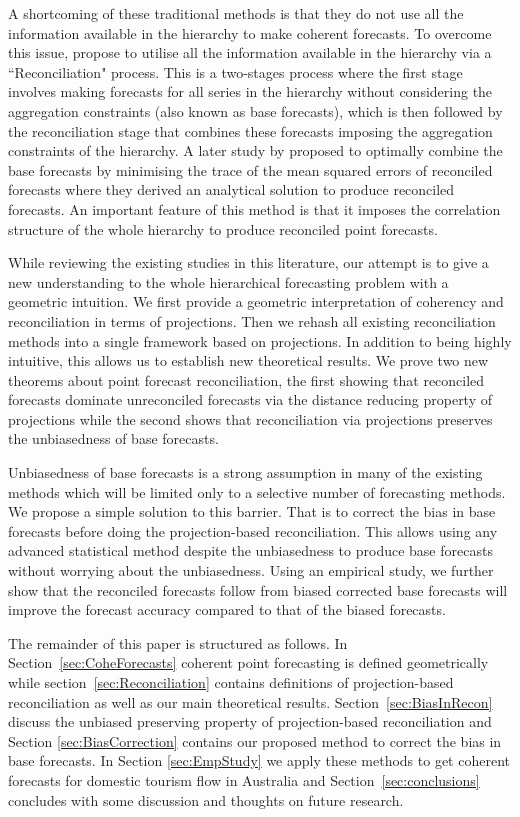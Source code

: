 \documentclass[12pt]{article}
\theoremstyle{definition}
\theoremstyle{property}
\begin{document}
	A shortcoming of these traditional methods is that they do not use all the information available in the hierarchy to make coherent forecasts. To overcome this issue, \cite{Hyndman2011} propose to utilise all the information available in the hierarchy via a ``Reconciliation" process. This is a two-stages process where the first stage involves making forecasts for all series in the hierarchy without considering the aggregation constraints (also known as base forecasts), which is then followed by the reconciliation stage that combines these forecasts imposing the aggregation constraints of the hierarchy. A later study by \cite{WicEtAl2019} proposed to optimally combine the base forecasts by minimising the trace of the mean squared errors of reconciled forecasts where they derived an analytical solution to produce reconciled forecasts. An important feature of this method is that it imposes the correlation structure of the whole hierarchy to produce reconciled point forecasts.
	
	While reviewing the existing studies in this literature, our attempt is to give a new understanding to the whole hierarchical forecasting problem with a geometric intuition. We first provide a geometric interpretation of coherency and reconciliation in terms of projections. Then we rehash all existing reconciliation methods into a single framework based on projections. In addition to being highly intuitive, this allows us to establish new theoretical results. We prove two new theorems about point forecast reconciliation, the first showing that reconciled forecasts dominate unreconciled forecasts via the distance reducing property of projections while the second shows that reconciliation via projections preserves the unbiasedness of base forecasts.
	
	Unbiasedness of base forecasts is a strong assumption in many of the existing methods which will be limited only to a selective number of forecasting methods. We propose a simple solution to this barrier. That is to correct the bias in base forecasts before doing the projection-based reconciliation. This allows using any advanced statistical method despite the unbiasedness to produce base forecasts without worrying about the unbiasedness. Using an empirical study, we further show that the reconciled forecasts follow from biased corrected base forecasts will improve the forecast accuracy compared to that of the biased forecasts.     
	
	The remainder of this paper is structured as follows. In Section~\ref{sec:CoheForecasts} coherent point forecasting is defined geometrically while section~\ref{sec:Reconciliation} contains definitions of projection-based reconciliation as well as our main theoretical results. Section~\ref{sec:BiasInRecon} discuss the unbiased preserving property of projection-based reconciliation and Section \ref{sec:BiasCorrection} contains our proposed method to correct the bias in base forecasts. In Section \ref{sec:EmpStudy} we apply these methods to get coherent forecasts for domestic tourism flow in Australia and Section~\ref{sec:conclusions} concludes with some discussion and thoughts on future research.  
\end{document}

